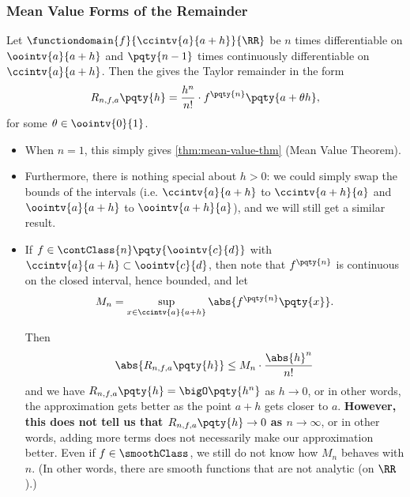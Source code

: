 \subsubsection{Mean Value Forms of the Remainder}

\begin{theorem}
    \label{thm:taylor-thm-langrange-remainder}%
    Let \(\functiondomain{f}{\ccintv{a}{a + h}}{\RR}\) be \(n\) times differentiable on \(\oointv{a}{a + h}\) and \(\pqty{n - 1}\) times continuously differentiable on \(\ccintv{a}{a + h}\). Then the  gives the Taylor remainder in the form
    \[
        R_{n, f, a} \pqty{h} = \frac{h^n}{n!} \cdot f^{\pqty{n}} \pqty{a + \theta h},
    \]
    for some \(\theta \in \oointv{0}{1}\).
\end{theorem}

\begin{remarks}
    \begin{itemize}
        \item When \(n = 1\), this simply gives \autoref{thm:mean-value-thm} (Mean Value Theorem).
        \item Furthermore, there is nothing special about \(h > 0\): we could simply swap the bounds of the intervals (i.e. \(\ccintv{a}{a + h}\) to \(\ccintv{a + h}{a}\) and \(\oointv{a}{a + h}\) to \(\oointv{a + h}{a}\)), and we will still get a similar result.
        \item If \(f \in \contClass{n} \pqty{\oointv{c}{d}}\) with \(\ccintv{a}{a + h} \subset \oointv{c}{d}\), then note that \(f^{\pqty{n}}\) is continuous on the closed interval, hence bounded, and let
        \[
            M_n = \sup_{x \in \ccintv{a}{a + h}} \abs{f^{\pqty{n}} \pqty{x}}.
        \]

        Then
        \[
            \abs{R_{n, f, a} \pqty{h}} \leq M_n \cdot \frac{\abs{h}^n}{n!}
        \]
        and we have \(R_{n, f, a} \pqty{h} = \bigO \pqty{h^n}\) as \(h \to 0\), or in other words, the approximation gets better as the point \(a + h\) gets closer to \(a\). \textbf{However, this does not tell us that \(R_{n, f, a} \pqty{h} \to 0\) as \(n \to \infty\)}, or in other words, adding more terms does not necessarily make our approximation better. Even if \(f \in \smoothClass\), we still do not know how \(M_n\) behaves with \(n\). (In other words, there are smooth functions that are not analytic (on \(\RR\)).)
    \end{itemize}
\end{remarks}

